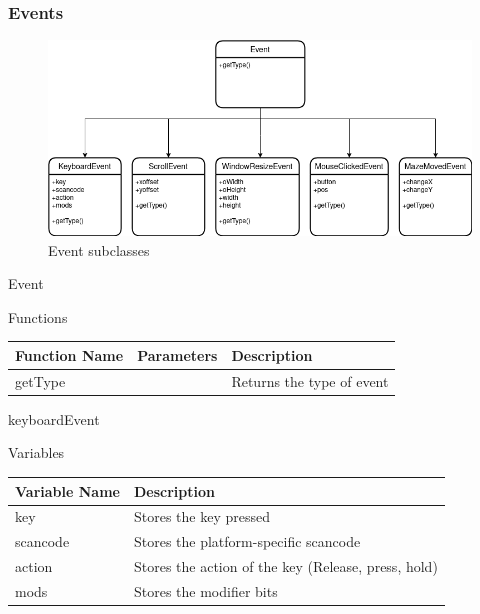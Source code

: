 \documentclass{article}
\begin{document}
            \subsubsection{Events}
                \begin{figure}[hbt!]
                    \centerline{\includegraphics[scale=0.5]{img/Classes/Events.png}}
                    \caption{Event subclasses}
                    \label{fig}
                \end{figure}
                Event
                \begin{center}
                    Functions
                    \begin{tabular}{ | m{} | m{}| m{} | }
                        \hline
                        \textbf{Function Name} & \textbf{Parameters} & \textbf{Description} \\
                        \hline
                        getType & & Returns the type of event \\
                        \hline
                    \end{tabular}
                \end{center}
                keyboardEvent
                \begin{center}
                    Variables
                    \begin{tabular}{ | m{} | m{} | }
                        \hline
                        \textbf{Variable Name} & \textbf{Description} \\
                        \hline
                        key & Stores the key pressed \\
                        \hline
                        scancode & Stores the platform-specific scancode \\
                        \hline
                        action & Stores the action of the key (Release, press, hold)\\
                        \hline
                        mods & Stores the modifier bits \\
                        \hline
                    \end{tabular}
                \end{center}
\end{document}
